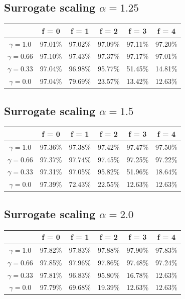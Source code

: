 \documentclass{article}
\begin{document}
\subsection{Surrogate scaling $\alpha = 1.25$}
\begin{table}[htbp]
    \centering
    \begin{tabular}{cccccc}
        \toprule
        & \textbf{f = 0} & \textbf{f = 1} & \textbf{f = 2} & \textbf{f = 3} & \textbf{f = 4} \\
        \midrule
        $\gamma = 1.0$ & 97.01\% & 97.02\% & 97.09\% & 97.11\% & 97.20\% \\
        $\gamma = 0.66$ & 97.10\% & 97.43\% & 97.37\% & 97.17\% & 97.01\% \\
        $\gamma = 0.33$ & 97.04\% & 96.98\% & 95.77\% & 51.45\% & 14.81\% \\
        $\gamma = 0.0$ & 97.04\% & 79.69\% & 23.57\% & 13.42\% & 12.63\% \\
        \bottomrule
    \end{tabular}
\end{table}
\subsection{Surrogate scaling $\alpha = 1.5$}
\begin{table}[htbp]
    \centering
    \begin{tabular}{cccccc}
        \toprule
        & \textbf{f = 0} & \textbf{f = 1} & \textbf{f = 2} & \textbf{f = 3} & \textbf{f = 4} \\
        \midrule
        $\gamma = 1.0$ & 97.36\% & 97.38\% & 97.42\% & 97.47\% & 97.50\% \\
        $\gamma = 0.66$ & 97.37\% & 97.74\% & 97.45\% & 97.25\% & 97.22\% \\
        $\gamma = 0.33$ & 97.31\% & 97.05\% & 95.82\% & 51.96\% & 18.64\% \\
        $\gamma = 0.0$ & 97.39\% & 72.43\% & 22.55\% & 12.63\% & 12.63\% \\
        \bottomrule
    \end{tabular}
\end{table}
\subsection{Surrogate scaling $\alpha = 2.0$}
\begin{table}[htbp]
    \centering
    \begin{tabular}{cccccc}
        \toprule
        & \textbf{f = 0} & \textbf{f = 1} & \textbf{f = 2} & \textbf{f = 3} & \textbf{f = 4} \\
        \midrule
        $\gamma = 1.0$ & 97.82\% & 97.83\% & 97.88\% & 97.90\% & 97.83\% \\
        $\gamma = 0.66$ & 97.85\% & 97.96\% & 97.86\% & 97.48\% & 97.24\% \\
        $\gamma = 0.33$ & 97.81\% & 96.83\% & 95.80\% & 16.78\% & 12.63\% \\
        $\gamma = 0.0$ & 97.79\% & 69.68\% & 19.39\% & 12.63\% & 12.63\% \\
        \bottomrule
    \end{tabular}
\end{table}
\end{document}
